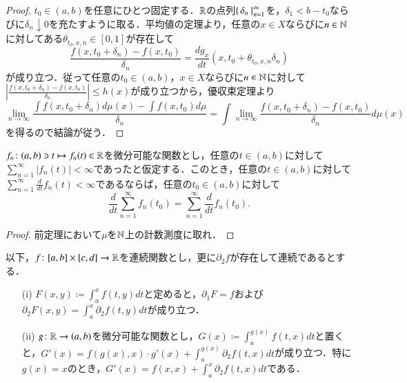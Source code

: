 \begin{proof}
$t_0\in(a,b)$を任意にひとつ固定する．$\mathbb{R}$の点列$\set{\delta_n}_{n=1}^\infty$を，$\delta_1 < b-t_0$ならびに$\delta_n \downarrow 0$を充たすように取る．平均値の定理より，任意の$x \in X$ならびに$n \in \mathbb{N}$に対してある$\theta_{t_0,x,n} \in [0,1]$が存在して
\begin{equation}
\frac{f(x,t_0+\delta_n) - f(x,t_0)}{\delta_n} = \frac{d g_x}{dt} (x,t_0+\theta_{t_0,x,n} \delta_n)
\end{equation}が成り立つ．従って任意の$t_0 \in (a,b)$，$x \in X$ならびに$n \in \mathbb{N}$に対して$\left|\frac{f(x,t_0+\delta_n) - f(x,t_0)}{\delta_n}\right| \leq h(x)$が成り立つから，優収束定理より
\begin{equation}
\lim_{n\to\infty}\frac{\int f(x,t_0+\delta_n) d\mu(x) - \int f(x,t_0) d\mu}{\delta_n}= \int \lim_{n\to\infty}\frac{f(x,t_0+\delta_n) - f(x,t_0)}{\delta_n} d\mu(x)
\end{equation}を得るので結論が従う．
\end{proof}

\begin{cor}[項別微分]
$f_n \colon (a,b) \ni t \mapsto f_n(t) \in \mathbb{R}$を微分可能な関数とし，任意の$t \in (a,b)$に対して$\sum_{n=1}^\infty |f_n(t)| < \infty$であったと仮定する．このとき，任意の$t \in (a,b)$に対して
$\sum_{n=1}^\infty \frac{d}{dt} f_n(t) < \infty$であるならば，任意の$t_0 \in (a,b)$に対して
\begin{equation}
\frac{d}{dt} \sum_{n=1}^\infty f_n(t_0) = \sum_{n=1}^\infty \frac{d}{dt} f_n(t_0).
\end{equation}
\end{cor}

\begin{proof}
前定理において$\mu$を$\mathbb{N}$上の計数測度に取れ．
\end{proof}

\begin{prop}
以下，$f \colon [a,b] \times [c,d] \to \mathbb{R}$を連続関数とし，更に$\partial_2 f$が存在して連続であるとする．
\begin{enumerate}
\item[(i)] $F(x,y) \coloneqq \int_a^x f(t,y) dt$と定めると，$\partial_1 F = f$および$\partial_2 F(x,y) = \int_a^x \partial_2 f(t,y) dt$が成り立つ．
\item[(ii)] $g \colon \mathbb{R} \to (a,b)$を微分可能な関数とし，$G(x) \coloneqq \int_a^{g(x)} f(t,x) dt$と置くと，$G'(x) = f(g(x), x)\cdot g'(x) + \int_a^{g(x)} \partial_2f(t,x) dt$が成り立つ．特に$g(x) = x$のとき，$G'(x) = f(x, x) + \int_a^x \partial_2f(t,x) dt$である．
\end{enumerate}
\end{prop}

